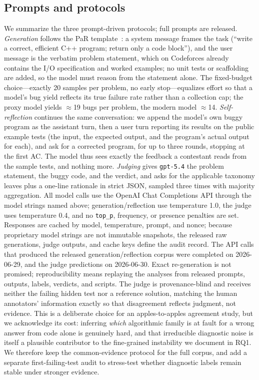 \documentclass[conference]{IEEEtran}
\begin{document}
\subsection{Prompts and protocols}
We summarize the three prompt-driven protocols; full prompts are released.
\emph{Generation} follows the PaR template~\cite{wei2026evaluating}: a system message
frames the task (``write a correct, efficient C++ program; return only a code
block''), and the user message is the verbatim problem statement, which on
Codeforces already contains the I/O specification and worked examples; no unit tests
or scaffolding are added, so the model must reason from the statement alone. The
fixed-budget choice---exactly 20 samples per problem, no early stop---equalizes
effort so that a model's bug yield reflects its true failure rate rather than a
collection cap; the proxy model yields $\approx$19 bugs per problem, the modern model
$\approx$14. \emph{Self-reflection} continues the same conversation: we append the
model's own buggy program as the assistant turn, then a user turn reporting its
results on the public example tests (the input, the expected output, and the
program's actual output for each), and ask for a corrected program, for up to three
rounds, stopping at the first AC. The model thus sees exactly the feedback a
contestant reads from the sample tests, and nothing more. \emph{Judging} gives
\texttt{gpt-5.4} the problem statement, the buggy code, and the verdict, and asks for
the applicable taxonomy leaves plus a one-line rationale in strict JSON, sampled
three times with majority aggregation. All model calls use the OpenAI Chat
Completions API through the model strings named above; generation/reflection use
temperature 1.0, the judge uses temperature 0.4, and no \texttt{top\_p}, frequency, or
presence penalties are set. Responses are cached by model, temperature, prompt, and
nonce; because proprietary model strings are not immutable snapshots, the released
raw generations, judge outputs, and cache keys define the audit record. The API calls
that produced the released generation/reflection corpus were completed on 2026-06-29,
and the judge predictions on 2026-06-30. Exact re-generation is not promised;
reproducibility means replaying the analyses from released prompts, outputs, labels,
verdicts, and scripts. The judge is provenance-blind and receives
neither the failing hidden test nor a reference solution, matching the human
annotators' information exactly so that disagreement reflects judgment, not evidence.
This is a deliberate choice for an apples-to-apples agreement study, but we
acknowledge its cost: inferring \emph{which} algorithmic family is at fault for a
wrong answer from code alone is genuinely hard, and that irreducible diagnostic noise
is itself a plausible contributor to the fine-grained instability we document in
RQ1. We therefore keep the common-evidence protocol for the full corpus, and add a
separate first-failing-test audit to stress-test whether diagnostic labels remain
stable under stronger evidence.
\end{document}
